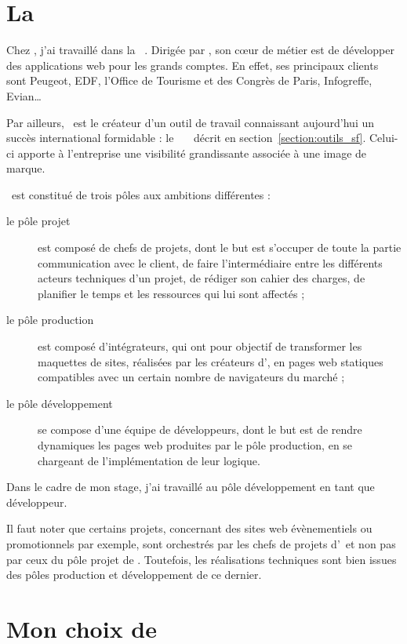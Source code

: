 \section{La \abufull\ \asl}

Chez \asensio, j'ai travaillé dans la \abufull\ \asl. Dirigée par \apotencier, son cœur de métier est de développer des applications web pour les grands comptes. En effet, ses principaux clients sont Peugeot, EDF, l'Office de Tourisme et des Congrès de Paris, Infogreffe, Evian\dots

Par ailleurs, \asl\ est le créateur d'un outil de travail connaissant aujourd'hui un succès international formidable : le \afm\ \aphp\ \asf\ décrit en section~\ref{section:outils_sf}. Celui-ci apporte à l'entreprise une visibilité grandissante associée à une image de marque. 

\asl\ est constitué de trois pôles aux ambitions différentes :

\begin{description}
	\item[le pôle projet] est composé de chefs de projets, dont le but est s'occuper de toute la partie communication avec le client, de faire l'intermédiaire entre les différents acteurs techniques d'un projet, de rédiger son cahier des charges, de planifier le temps et les ressources qui lui sont affectés ;
	\item[le pôle production] est composé d'intégrateurs, qui ont pour objectif de transformer les maquettes de sites, réalisées par les créateurs d'\aes, en pages web statiques compatibles avec un certain nombre de navigateurs du marché ;
	\item[le pôle développement] se compose d'une équipe de développeurs, dont le but est de rendre dynamiques les pages web produites par le pôle production, en se chargeant de l'implémentation de leur logique.
\end{description}

Dans le cadre de mon stage, j'ai travaillé au pôle développement en tant que développeur.

Il faut noter que certains projets, concernant des sites web évènementiels ou promotionnels par exemple, sont orchestrés par les chefs de projets d'\aes\ et non pas par ceux du pôle projet de \asl. Toutefois, les réalisations techniques sont bien issues des pôles production et développement de ce dernier.


\section{Mon choix de \asl}

